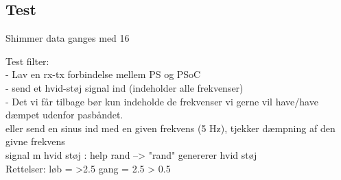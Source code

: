 \subsection{Test}

Shimmer data ganges med 16


Test filter:\\
- Lav en rx-tx forbindelse mellem PS og PSoC\\
- send et hvid-støj signal ind (indeholder alle frekvenser)\\
- Det vi får tilbage bør kun indeholde de frekvenser vi gerne vil have/have dæmpet udenfor pasbåndet. \\

eller send en sinus ind med en given frekvens (5 Hz), tjekker dæmpning af den givne frekvens\\

signal m hvid støj : help rand --> "rand" genererer hvid støj\\












Rettelser:
løb = >2.5
gang = 2.5 > 0.5
